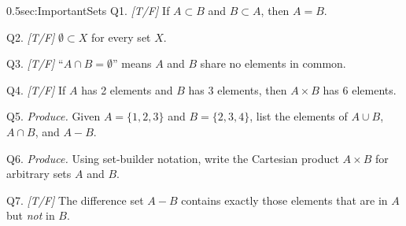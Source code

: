 \begin{selfcheckbox}{0.5}{sec:ImportantSets}
  \hypertarget{q:ch0:sets}{}
  Q1. \textit{[T/F]} If $A \subset B$ and $B \subset A$, then $A = B$.\par\smallskip
  Q2. \textit{[T/F]} $\emptyset \subset X$ for every set $X$.\par\smallskip
  Q3. \textit{[T/F]} ``$A \cap B = \emptyset$'' means $A$ and $B$ share no elements in common.\par\smallskip
  Q4. \textit{[T/F]} If $A$ has 2 elements and $B$ has 3 elements, then $A \times B$ has 6 elements.\par\smallskip
  Q5. \textit{Produce.} Given $A = \{1, 2, 3\}$ and $B = \{2, 3, 4\}$, list the elements of $A \cup B$, $A \cap B$, and $A - B$.\par\smallskip
  Q6. \textit{Produce.} Using set-builder notation, write the Cartesian product $A \times B$ for arbitrary sets $A$ and $B$.\par\smallskip
  Q7. \textit{[T/F]} The difference set $A - B$ contains exactly those elements that are in $A$ but \emph{not} in $B$.
  \par\medskip\hfill{}
\end{selfcheckbox}


